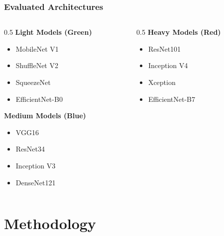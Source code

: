 \documentclass{beamer}
\begin{document}
\begin{frame}
    \frametitle{Evaluated Architectures}
    \begin{columns}
        \begin{column}{0.5\textwidth}
            \textbf{Light Models (Green)}
            \begin{itemize}
                \item MobileNet V1
                \item ShuffleNet V2
                \item SqueezeNet
                \item EfficientNet-B0
            \end{itemize}
            \vspace{0.4cm}
            \textbf{Medium Models (Blue)}
            \begin{itemize}
                \item VGG16
                \item ResNet34
                \item Inception V3
                \item DenseNet121
            \end{itemize}
        \end{column}

        \begin{column}{0.5\textwidth}
            \textbf{Heavy Models (Red)}
            \begin{itemize}
                \item ResNet101
                \item Inception V4
                \item Xception
                \item EfficientNet-B7
            \end{itemize}
            
        \end{column}
    \end{columns}
\end{frame}

\section{Methodology}
\end{document}
